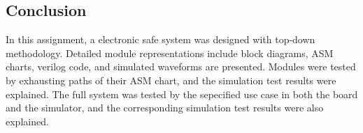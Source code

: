 \subsection{Conclusion}

In this assignment, a electronic safe system was designed with top-down methodology. Detailed module representations include block diagrams, ASM charts, verilog code, and simulated waveforms are presented. Modules were tested by exhausting paths of their ASM chart, and the simulation test results were explained. The full system was tested by the sepecified use case in both the board and the simulator, and the corresponding simulation test results were also explained.
